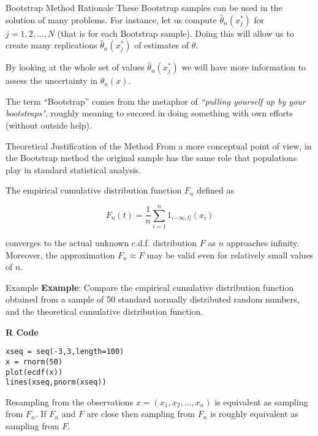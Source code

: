 \documentclass[8pt]{beamer}
\begin{document}
\begin{frame}{Bootstrap Method Rationale}
These Bootstrap samples can be used in the solution of many problems. For instance, let us compute   $\widehat{\theta}_n(x_j^*)$ for $j=1,2,...,N$ (that is for each Bootstrap sample). Doing this will allow us to create many replications $\widehat{\theta}_n(x_j^*)$ of estimates of $\theta$.

\vspace{2mm}
  
By looking at the whole set of values  $\widehat{\theta}_n(x_j^*)$ we will have more information to assess the uncertainty in $\widehat{\theta}_n(x)$.

\vspace{2mm}
  
The term ``Bootstrap'' comes from the metaphor of {\it ``pulling yourself up  by your bootstraps"},  roughly meaning to succeed in doing  something with own efforts (without outside help). 
\end{frame}

\begin{frame}{Theoretical Justification of the Method}
From a more conceptual point of view, in the Bootstrap method the original sample has the same role that populations play in standard statistical analysis.

\vspace{2mm}
   
The empirical cumulative distribution function $F_n$ defined as

\begin{equation*}
F_n(t)=\frac{1}{n}\sum_{i=1}^n 1_{(-\infty,t]}(x_i)
\end{equation*}

converges to the actual unknown c.d.f. distribution $F$ as $n$ approaches infinity. Moreover, the approximation $F_n \approx F$ may be valid even for relatively small values of $n$.
\end{frame}

\begin{frame}[fragile]{Example}
\textbf{Example}: Compare the empirical cumulative distribution function obtained from a sample of 50 standard normally distributed random numbers, and the theoretical cumulative distribution function.

\vspace{3mm}
   
\textbf{R Code}

\begin{lstlisting}
xseq = seq(-3,3,length=100)
x = rnorm(50)
plot(ecdf(x))
lines(xseq,pnorm(xseq))
\end{lstlisting}

Resampling from the observations $x=(x_1,x_2,\ldots,x_n)$ is equivalent as sampling from $F_n$. If $F_n$ and $F$ are close then sampling from $F_n$ is roughly equivalent as sampling from $F$.
\end{frame}
\end{document}
